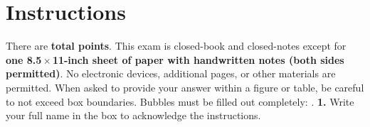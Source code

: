 \vspace*{-0.65in}
\section*{Instructions}
\vspace*{-0.1in}
There are {\bf
{} total points}.
This exam is closed-book and closed-notes except for {\bf one
8.5\,$\times$\,11-inch sheet of paper with handwritten notes (both sides
permitted)}. No electronic devices, additional pages, or other materials are
permitted.
When asked to provide your answer within a figure or table, be careful to not
exceed box boundaries. Bubbles must be filled out completely:
 .
{\bf 1.} Write your full name in the box to acknowledge the instructions.

